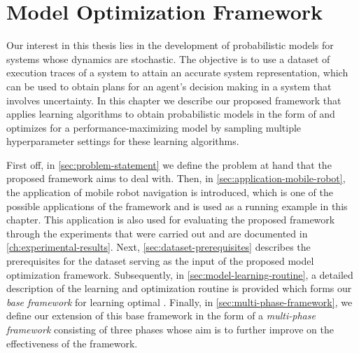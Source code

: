 \chapter{Model Optimization Framework}
\label{ch:methodology}

Our interest in this thesis lies in the development of probabilistic models for systems whose dynamics are stochastic.
The objective is to use a dataset of execution traces of a system to attain an accurate system representation, which can be used to obtain plans for an agent's decision making in a system that involves uncertainty.
In this chapter we describe our proposed framework that applies learning algorithms to obtain probabilistic models in the form of  and optimizes for a performance-maximizing model by sampling multiple hyperparameter settings for these learning algorithms.

First off, in \autoref{sec:problem-statement} we define the problem at hand that the proposed framework aims to deal with.
Then, in \autoref{sec:application-mobile-robot}, the application of mobile robot navigation is introduced, which is one of the possible applications of the framework and is used as a running example in this chapter.
This application is also used for evaluating the proposed framework through the experiments that were carried out and are documented in \autoref{ch:experimental-results}.
Next, \autoref{sec:dataset-prerequisites} describes the prerequisites for the dataset serving as the input of the proposed model optimization framework.
Subsequently, in \autoref{sec:model-learning-routine}, a detailed description of the learning and optimization routine is provided which forms our \textit{base framework} for learning optimal .
Finally, in \autoref{sec:multi-phase-framework}, we define our extension of this base framework in the form of a \textit{multi-phase framework} consisting of three phases whose aim is to further improve on the effectiveness of the framework.

